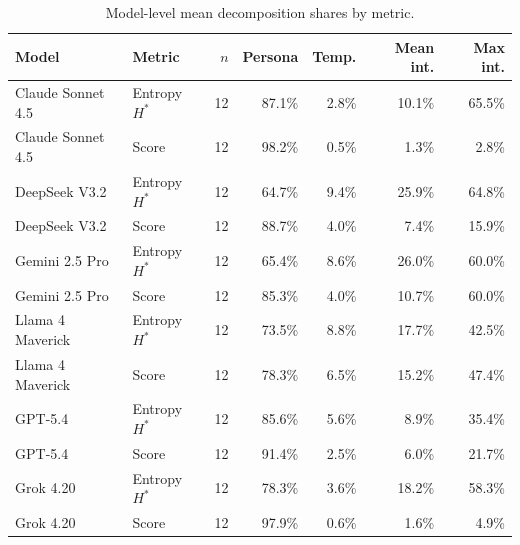 \begin{table}[t]
\centering
\caption{Model-level mean decomposition shares by metric.}
\label{tab:scis-model-summary}
\begin{tabular}{llrrrrr}
\hline
Model & Metric & $n$ & Persona & Temp. & Mean int. & Max int. \\
\hline
Claude Sonnet 4.5 & Entropy $H^*$ & 12 & 87.1\% & 2.8\% & 10.1\% & 65.5\% \\
Claude Sonnet 4.5 & Score & 12 & 98.2\% & 0.5\% & 1.3\% & 2.8\% \\
DeepSeek V3.2 & Entropy $H^*$ & 12 & 64.7\% & 9.4\% & 25.9\% & 64.8\% \\
DeepSeek V3.2 & Score & 12 & 88.7\% & 4.0\% & 7.4\% & 15.9\% \\
Gemini 2.5 Pro & Entropy $H^*$ & 12 & 65.4\% & 8.6\% & 26.0\% & 60.0\% \\
Gemini 2.5 Pro & Score & 12 & 85.3\% & 4.0\% & 10.7\% & 60.0\% \\
Llama 4 Maverick & Entropy $H^*$ & 12 & 73.5\% & 8.8\% & 17.7\% & 42.5\% \\
Llama 4 Maverick & Score & 12 & 78.3\% & 6.5\% & 15.2\% & 47.4\% \\
GPT-5.4 & Entropy $H^*$ & 12 & 85.6\% & 5.6\% & 8.9\% & 35.4\% \\
GPT-5.4 & Score & 12 & 91.4\% & 2.5\% & 6.0\% & 21.7\% \\
Grok 4.20 & Entropy $H^*$ & 12 & 78.3\% & 3.6\% & 18.2\% & 58.3\% \\
Grok 4.20 & Score & 12 & 97.9\% & 0.6\% & 1.6\% & 4.9\% \\
\hline
\end{tabular}
\end{table}
